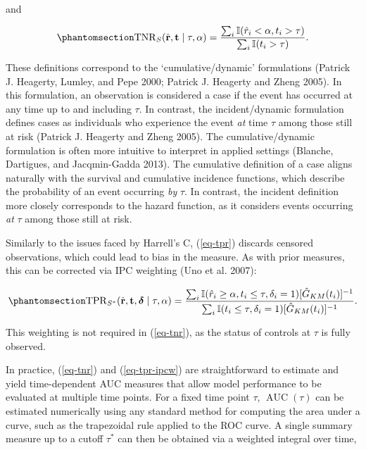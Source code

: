 \documentclass[
  letterpaper,
  krantz2]{style/krantz}
\begin{document}
and

\begin{equation}\phantomsection\label{eq-tnr}{
\mathrm{TNR}_S(\hat{\mathbf{r}}, \mathbf{t}\mid  \tau, \alpha) = \frac{\sum_i \mathbb{I}(\hat{r}_i < \alpha, t_i > \tau)}{\sum_i \mathbb{I}(t_i > \tau)}.
}\end{equation}

These definitions correspond to the `cumulative/dynamic' formulations
(Patrick J. Heagerty, Lumley, and Pepe 2000; Patrick J. Heagerty and
Zheng 2005). In this
formulation, an observation is considered a case if the event has
occurred at any time up to and including \(\tau\). In contrast, the
incident/dynamic
formulation defines cases as individuals who experience the event
\emph{at} time \(\tau\) among those still at risk (Patrick J. Heagerty
and Zheng 2005). The cumulative/dynamic formulation is often more
intuitive to interpret in applied settings (Blanche, Dartigues, and
Jacqmin-Gadda 2013). The cumulative definition of a case aligns
naturally with the survival and cumulative incidence functions, which
describe the probability of an event occurring \emph{by} \(\tau\). In
contrast, the incident definition more closely corresponds to the hazard
function, as it considers events occurring \emph{at} \(\tau\) among
those still at risk.

Similarly to the issues faced by Harrell's
C, (\ref{eq-tpr}) discards censored
observations, which could lead to bias in the measure. As with prior
measures, this can be corrected via IPC
weighting
(Uno et al. 2007):

\begin{equation}\phantomsection\label{eq-tpr-ipcw}{
\mathrm{TPR}_{S^*}(\hat{\mathbf{r}}, \mathbf{t}, \boldsymbol{\delta}\mid  \tau, \alpha) = \frac{\sum_i \mathbb{I}(\hat{r}_i \ge \alpha, t_i \le \tau, \delta_i = 1)[\hat{G}_{KM}(t_i)]^{-1}}{\sum_i \mathbb{I}(t_i \le \tau, \delta_i = 1)[\hat{G}_{KM}(t_i)]^{-1}}.
}\end{equation}

This weighting is not required in (\ref{eq-tnr}), as the status of
controls at \(\tau\) is fully observed.

In practice, (\ref{eq-tnr}) and (\ref{eq-tpr-ipcw}) are straightforward
to estimate and yield time-dependent
AUC measures that allow model
performance to be evaluated at multiple time points. For a fixed time
point \(\tau\), \(\operatorname{AUC}(\tau)\) can be estimated
numerically using any standard method for computing the area under a
curve, such as the trapezoidal rule applied to the ROC curve. A single
summary measure up to a cutoff \(\tau^*\) can then be obtained via a
weighted integral over time,
\end{document}
